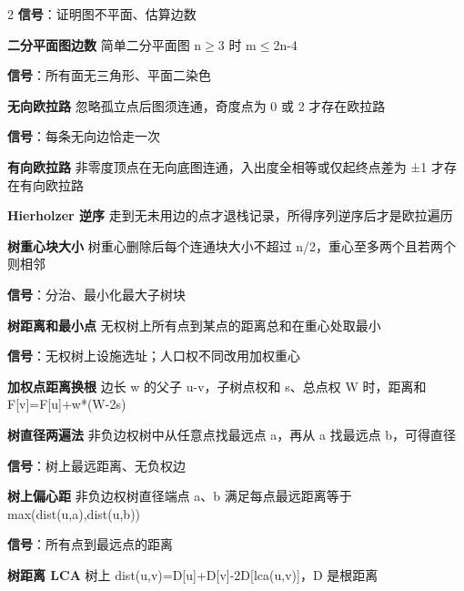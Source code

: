 \documentclass[UTF8,fontset=fandol,a4paper,twoside]{ctexart}
\begin{document}
\begin{multicols}{2}
\textbf{信号}：证明图不平面、估算边数\par
\par\textbf{二分平面图边数}\quad
简单二分平面图 n\ensuremath{\ge}3 时 m\ensuremath{\le}2n-\allowbreak{}4\par
\textbf{信号}：所有面无三角形、平面二染色\par
\par\textbf{无向欧拉路}\quad
忽略孤立点后图须连通，奇度点为 0 或 2 才存在欧拉路\par
\textbf{信号}：每条无向边恰走一次\par
\par\textbf{有向欧拉路}\quad
非零度顶点在无向底图连通，入出度全相等或仅起终点差为 ±1 才存在有向欧拉路\par
\par\textbf{Hierholzer 逆序}\quad
走到无未用边的点才退栈记录，所得序列逆序后才是欧拉遍历\par
\par\textbf{树重心块大小}\quad
树重心删除后每个连通块大小不超过 n/\allowbreak{}2，重心至多两个且若两个则相邻\par
\textbf{信号}：分治、最小化最大子树块\par
\par\textbf{树距离和最小点}\quad
无权树上所有点到某点的距离总和在重心处取最小\par
\textbf{信号}：无权树上设施选址；人口权不同改用加权重心\par
\par\textbf{加权点距离换根}\quad
边长 w 的父子 u-\allowbreak{}v，子树点权和 s、总点权 W 时，距离和 F[\allowbreak{}v]\allowbreak{}=\allowbreak{}F[\allowbreak{}u]\allowbreak{}+\allowbreak{}w*(\allowbreak{}W-\allowbreak{}2s)\allowbreak{}\par
\par\textbf{树直径两遍法}\quad
非负边权树中从任意点找最远点 a，再从 a 找最远点 b，可得直径\par
\textbf{信号}：树上最远距离、无负权边\par
\par\textbf{树上偏心距}\quad
非负边权树直径端点 a、b 满足每点最远距离等于 max(\allowbreak{}dist(\allowbreak{}u,\allowbreak{}a)\allowbreak{},\allowbreak{}dist(\allowbreak{}u,\allowbreak{}b)\allowbreak{})\allowbreak{}\par
\textbf{信号}：所有点到最远点的距离\par
\par\textbf{树距离 LCA}\quad
树上 dist(\allowbreak{}u,\allowbreak{}v)\allowbreak{}=\allowbreak{}D[\allowbreak{}u]\allowbreak{}+\allowbreak{}D[\allowbreak{}v]\allowbreak{}-\allowbreak{}2D[\allowbreak{}lca(\allowbreak{}u,\allowbreak{}v)\allowbreak{}]\allowbreak{}，D 是根距离\par

\end{multicols}
\end{document}
